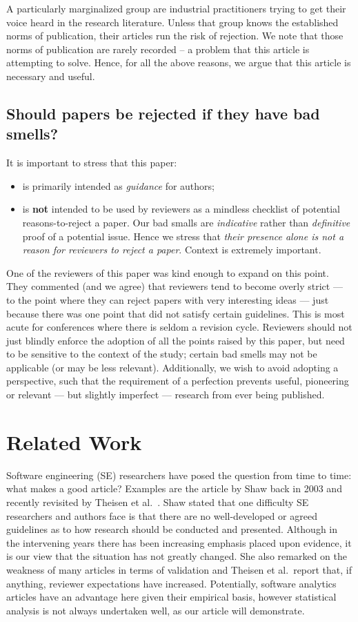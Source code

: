 \documentclass[10pt]{elsarticle}
\newcommand{\bi}{\begin{itemize}}
\newcommand{\ei}{\end{itemize}}
\newcommand{\RED}{\color{black}}
\newcommand{\BLACK}{\color{black}}
\begin{document}
A particularly marginalized group are industrial practitioners trying to get their voice heard in the research literature.  Unless that group knows the established norms of publication, their articles run the risk of rejection. We note that those norms of publication are rarely recorded -- a problem that this article is attempting to solve.  Hence, for all the above reasons, we argue that this article is necessary and useful.

\RED \subsection{Should papers be rejected if they have bad smells?}\label{sec:reject}

It is important to stress that this paper:
\bi
\item
is primarily intended as \textit{guidance} for authors;
\item
is {\bf not} intended to be used by reviewers as a mindless checklist of potential reasons-to-reject a paper.  
Our bad smalls are {\em indicative} rather than {\em definitive} proof of a potential issue.  Hence we stress that {\em their presence alone is not a reason for reviewers to reject a paper}.   Context is extremely important.
\ei
One of the reviewers of this paper was kind enough to expand on this point. They commented (and we agree) that reviewers tend to become overly strict --- to the point where they can reject papers with very interesting ideas --- just because there was one point that did not satisfy certain guidelines.  This is most acute for conferences where there is seldom a revision cycle. Reviewers should not just blindly enforce the adoption of all the points raised by this paper, but need to be sensitive to the context of the study; certain bad smells may not be applicable (or may be less relevant).   Additionally, we wish to avoid adopting a perspective, such that the requirement of a perfection prevents useful, pioneering or relevant --- but slightly imperfect --- research from ever being published.
\BLACK
 

\section{Related Work}\label{Sec:RelWk}
 
Software engineering (SE) researchers have posed the question from time to time: what makes a good article?  Examples are the article by Shaw \cite{Shaw03} back in 2003 and recently revisited by Theisen et al.~\cite{Thei17}.  Shaw stated that one difficulty SE researchers and authors face is that there are no well-developed or agreed guidelines as to how research should be conducted and presented.  Although in the intervening years there has been increasing emphasis placed upon evidence, it is our view that the situation has not greatly changed.  She also remarked on the weakness of many articles in terms of  validation and Theisen et al.\ report that, if anything, reviewer expectations have increased.  Potentially, software analytics articles have an advantage here given their empirical basis, however statistical analysis is not always undertaken well, as our article will demonstrate.
\end{document}
